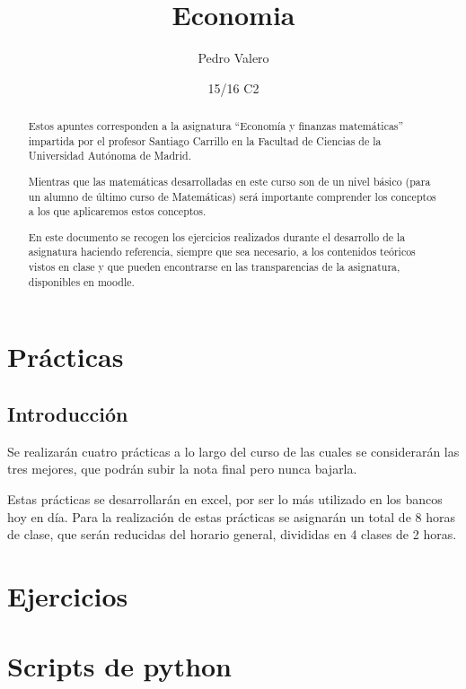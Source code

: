 \documentclass{apuntes}
\title{Economia}
\author{Pedro Valero}
\date{15/16 C2}
\begin{document}
\pagestyle{plain}

\begin{abstract}
Estos apuntes corresponden a la asignatura ``Economía y finanzas matemáticas'' impartida por el profesor Santiago Carrillo en la Facultad de Ciencias de la Universidad Autónoma de Madrid.

Mientras que las matemáticas desarrolladas en este curso son de un nivel básico (para un alumno de último curso de Matemáticas) será importante comprender los conceptos a los que aplicaremos estos conceptos.

En este documento se recogen los ejercicios realizados durante el desarrollo de la asignatura haciendo referencia, siempre que sea necesario, a los contenidos teóricos vistos en clase y que pueden encontrarse en las transparencias de la asignatura, disponibles en moodle.
\end{abstract}

\maketitle

\tableofcontents
\newpage

\appendix

\chapter{Prácticas}
\section{Introducción}
Se realizarán cuatro prácticas a lo largo del curso de las cuales se considerarán las tres mejores, que podrán subir la nota final pero nunca bajarla.

Estas prácticas se desarrollarán en excel, por ser lo más utilizado en los bancos hoy en día. Para la realización de estas prácticas se asignarán un total de 8 horas de clase, que serán reducidas del horario general, divididas en 4 clases de 2 horas.

\chapter{Ejercicios}


\chapter{Scripts de python}
\end{document}
